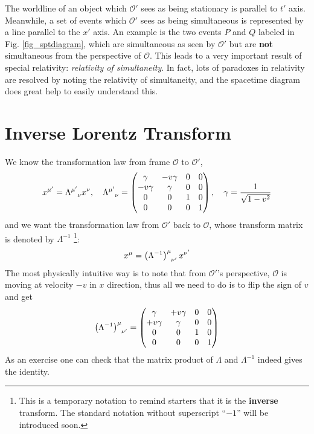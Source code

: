 \documentclass[11pt]{article}
\begin{document}
The worldline of an object which $\mathcal{O}'$ sees as being stationary is parallel to $t'$ axis. Meanwhile, a set of events which $\mathcal{O}'$ sees as being simultaneous is represented by a line parallel to the $x'$ axis. An example is the two events $P$ and $Q$ labeled in Fig. \ref{fig_sptdiagram}, which are simultaneous as seen by $\mathcal{O}'$ but are \textbf{not} simultaneous from the perspective of $\mathcal{O}$. This leads to a very important result of special relativity: \textit{relativity of simultaneity}. In fact, lots of paradoxes in relativity are resolved by noting the relativity of simultaneity, and the spacetime diagram does great help to easily understand this.

\section{Inverse Lorentz Transform}

We know the transformation law from frame $\mathcal{O}$ to $\mathcal{O}'$,
\begin{equation}
    x^{\mu'}=\tensor{\Lambda}{^{\mu'}_\nu}x^\nu, \quad \tensor{\Lambda}{^{\mu'}_\nu}=
    \begin{pmatrix}
        \gamma & -v\gamma & 0 & 0 \\
        -v\gamma & \gamma & 0 & 0 \\
        0 & 0 & 1 & 0 \\
        0 & 0 & 0 & 1
    \end{pmatrix},\quad
    \gamma=\frac{1}{\sqrt{1-v^2}}
\end{equation}
and we want the transformation law from $\mathcal{O}'$ back to $\mathcal{O}$, whose transform matrix is denoted by $\Lambda^{-1}$ \footnote{This is a temporary notation to remind starters that it is the \textbf{inverse} transform. The standard notation without superscript ``$-1$'' will be introduced soon.}:
\begin{equation}
    x^\mu=\tensor{\left(\Lambda^{-1}\right)}{^\mu_{\nu'}}x^{\nu'}
\end{equation}
The most physically intuitive way is to note that from $\mathcal{O}'$'s perspective, $\mathcal{O}$ is moving at velocity $-v$ in $x$ direction, thus all we need to do is to flip the sign of $v$ and get
\begin{equation}
    \tensor{\left(\Lambda^{-1}\right)}{^\mu_{\nu'}}=
    \begin{pmatrix}
        \gamma & +v\gamma & 0 & 0 \\
        +v\gamma & \gamma & 0 & 0 \\
        0 & 0 & 1 & 0 \\
        0 & 0 & 0 & 1
    \end{pmatrix}
\end{equation}
As an exercise one can check that the matrix product of $\Lambda$ and $\Lambda^{-1}$ indeed gives the identity.
\end{document}

